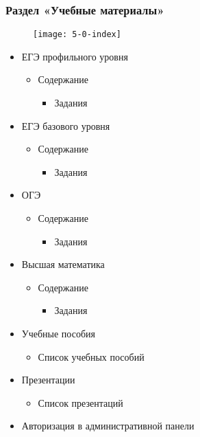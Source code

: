 \subsubsection{Раздел «Учебные материалы»}
\begin{figure}[H]
	\texttt{[image: 5-0-index]}
\end{figure}
\begin{itemize}
	\item ЕГЭ профильного уровня
	\begin{itemize}
		\item Содержание
		\begin{itemize}
			\item Задания
		\end{itemize}
	\end{itemize}

	\item ЕГЭ базового уровня
	\begin{itemize}
		\item Содержание
		\begin{itemize}
			\item Задания
		\end{itemize}
	\end{itemize}

	\item ОГЭ
	\begin{itemize}
		\item Содержание
		\begin{itemize}
			\item Задания
		\end{itemize}
	\end{itemize}

	\item Высшая математика
	\begin{itemize}
		\item Содержание
		\begin{itemize}
			\item Задания
		\end{itemize}
	\end{itemize}

	\item Учебные пособия
	\begin{itemize}
		\item Список учебных пособий
	\end{itemize}

	\item Презентации
	\begin{itemize}
		\item Список презентаций
	\end{itemize}

	\item Авторизация в административной панели
\end{itemize}

